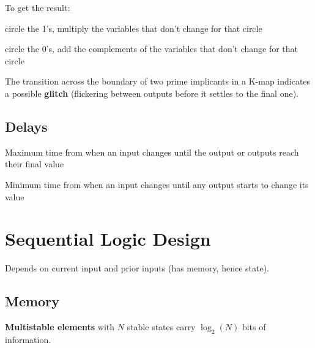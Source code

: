 \documentclass[11pt]{article}
\begin{document}
To get the result:
\begin{description}[labelindent=16pt,style=multiline,leftmargin=4cm, noitemsep]
	\item[sum of products:] circle the 1's, multiply the variables that don't change for that circle
	\item[product of sums:] 	circle the 0's, add the complements of the variables that don't change for that circle
\end{description}


The transition across the boundary of two prime implicants in a K-map indicates a possible \textbf{glitch} (flickering between outputs before it settles to the final one).

\subsection{Delays}

\begin{description}[labelindent=16pt,style=multiline,leftmargin=5.5cm, noitemsep]
	\item[Propagation delay $t_{pd}$:] Maximum time from when an input changes until the output or outputs reach their final value
	\item[Contamination delay $t_{cd}$:] Minimum time from when an input changes until any output starts to change its value
\end{description}

\section{Sequential Logic Design}

Depends on current input and prior inputs (has memory, hence state).

\subsection{Memory}

\textbf{Multistable elements} with $N$ stable states carry $\log_2(N)$ bits of information.
\end{document}
